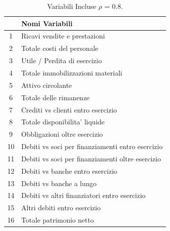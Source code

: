 \begin{table}[!h]

\caption{\label{tab:table:variabiliinclusecampione}Variabili Incluse $\rho$ = 0.8.}
\centering
\begin{tabular}[t]{cl}
\toprule
 & Nomi Variabili\\
\midrule
1 & Ricavi vendite e prestazioni\\
2 & Totale costi del personale\\
3 & Utile / Perdita di esercizio\\
4 & Totale immobilizzazioni materiali\\
5 & Attivo circolante\\
6 & Totale delle rimanenze\\
7 & Crediti vs clienti entro esercizio\\
8 & Totale disponibilita' liquide\\
9 & Obbligazioni oltre esercizio\\
10 & Debiti vs soci per finanziamenti entro esercizio\\
11 & Debiti vs soci per finanziamenti oltre esercizio\\
12 & Debiti vs banche entro esercizio\\
13 & Debiti vs banche a lungo\\
14 & Debiti vs altri finanziatori entro esercizio\\
15 & Altri debiti entro esercizio\\
16 & Totale patrimonio netto\\
\bottomrule
\end{tabular}
\end{table}